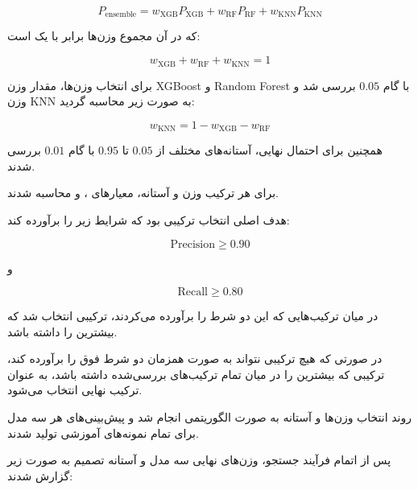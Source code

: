 \documentclass[10pt,a4paper,twocolumn]{article}
\begin{document}
\[
P_{\mathrm{ensemble}}
=
w_{\mathrm{XGB}}P_{\mathrm{XGB}}
+
w_{\mathrm{RF}}P_{\mathrm{RF}}
+
w_{\mathrm{KNN}}P_{\mathrm{KNN}}
\]

که در آن مجموع وزن‌ها برابر با یک است:

\[
w_{\mathrm{XGB}}
+
w_{\mathrm{RF}}
+
w_{\mathrm{KNN}}
=
1
\]

برای انتخاب وزن‌ها، مقدار وزن XGBoost و Random Forest با
گام $0.05$ بررسی شد و وزن KNN به صورت زیر محاسبه گردید:

\[
w_{\mathrm{KNN}}
=
1-w_{\mathrm{XGB}}-w_{\mathrm{RF}}
\]

همچنین برای احتمال نهایی، آستانه‌های مختلف از $0.05$ تا
$0.95$ با گام $0.01$ بررسی شدند.

برای هر ترکیب وزن و آستانه، معیارهای
،  و  محاسبه شدند.

هدف اصلی انتخاب ترکیبی بود که شرایط زیر را برآورده کند:

\[
\mathrm{Precision} \geq 0.90
\]

و

\[
\mathrm{Recall} \geq 0.80
\]

در میان ترکیب‌هایی که این دو شرط را برآورده می‌کردند،
ترکیبی انتخاب شد که بیشترین  را داشته باشد.

در صورتی که هیچ ترکیبی نتواند به صورت همزمان دو شرط فوق را
برآورده کند، ترکیبی که بیشترین  را در میان تمام
ترکیب‌های بررسی‌شده داشته باشد، به عنوان ترکیب نهایی انتخاب
می‌شود.

روند انتخاب وزن‌ها و آستانه به صورت الگوریتمی انجام شد و
پیش‌بینی‌های  هر سه مدل برای تمام نمونه‌های آموزشی
تولید شدند.

پس از اتمام فرآیند جستجو، وزن‌های نهایی سه مدل و آستانه
تصمیم به صورت زیر گزارش شدند:
\end{document}
